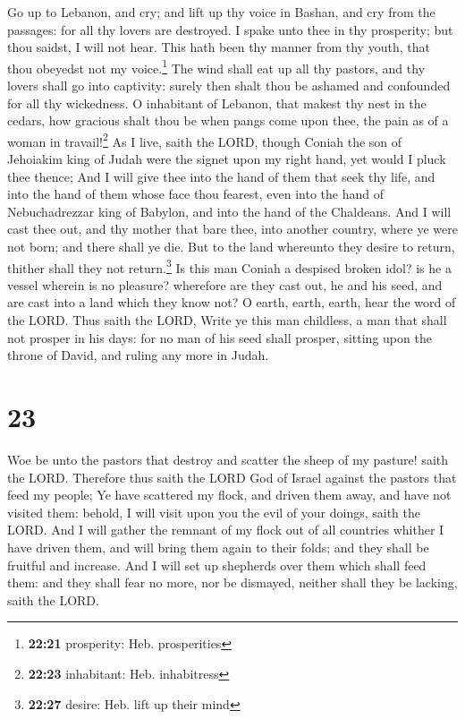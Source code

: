  Go up to Lebanon, and cry; and lift up thy voice in
Bashan, and cry from the passages: for all thy lovers are destroyed.
 I spake unto thee in thy prosperity; but thou saidst, I
will not hear. This hath been thy manner from thy youth, that thou
obeyedst not my voice.\footnote{\textbf{22:21} prosperity: Heb.
  prosperities}  The wind shall eat up all thy pastors,
and thy lovers shall go into captivity: surely then shalt thou be
ashamed and confounded for all thy wickedness.  O
inhabitant of Lebanon, that makest thy nest in the cedars, how gracious
shalt thou be when pangs come upon thee, the pain as of a woman in
travail!\footnote{\textbf{22:23} inhabitant: Heb. inhabitress}
 As I live, saith the LORD, though Coniah the son of
Jehoiakim king of Judah were the signet upon my right hand, yet would I
pluck thee thence;  And I will give thee into the hand of
them that seek thy life, and into the hand of them whose face thou
fearest, even into the hand of Nebuchadrezzar king of Babylon, and into
the hand of the Chaldeans.  And I will cast thee out, and
thy mother that bare thee, into another country, where ye were not born;
and there shall ye die.  But to the land whereunto they
desire to return, thither shall they not return.\footnote{\textbf{22:27}
  desire: Heb. lift up their mind}  Is this man Coniah a
despised broken idol? is he a vessel wherein is no pleasure? wherefore
are they cast out, he and his seed, and are cast into a land which they
know not?  O earth, earth, earth, hear the word of the
LORD.  Thus saith the LORD, Write ye this man childless,
a man that shall not prosper in his days: for no man of his seed shall
prosper, sitting upon the throne of David, and ruling any more in Judah.

\hypertarget{section-22}{%
\section{23}\label{section-22}}

 Woe be unto the pastors that destroy and scatter the
sheep of my pasture! saith the LORD.  Therefore thus saith
the LORD God of Israel against the pastors that feed my people; Ye have
scattered my flock, and driven them away, and have not visited them:
behold, I will visit upon you the evil of your doings, saith the LORD.
 And I will gather the remnant of my flock out of all
countries whither I have driven them, and will bring them again to their
folds; and they shall be fruitful and increase.  And I
will set up shepherds over them which shall feed them: and they shall
fear no more, nor be dismayed, neither shall they be lacking, saith the
LORD.

